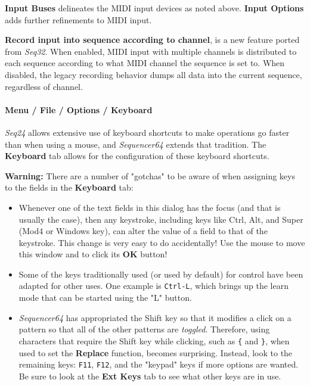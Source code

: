    \textbf{Input Buses} delineates the MIDI input devices as noted above.
   \textbf{Input Options} adds further refinements to MIDI input.

   \textbf{Record input into sequence according to channel},
   is a new feature ported from \textsl{Seq32}.
   When enabled, MIDI input with multiple channels is distributed to
   each sequence according to what MIDI channel the sequence is set to.
   When disabled, the legacy recording behavior dumps all data into the current
   sequence, regardless of channel.

\paragraph{Menu / File / Options / Keyboard }
\label{paragraph:seq64_menu_file_options_keyboard}

   \textsl{Seq24} allows extensive use of
   keyboard shortcuts to make operations go faster than when using a mouse,
   and \textsl{Sequencer64} extends that tradition.
   The \textbf{Keyboard} tab allows for the configuration of these keyboard
   shortcuts.

   \textbf{Warning:}
   There are a number of "gotchas" to be aware of when assigning keys to the
   fields in the \textbf{Keyboard} tab:

   \begin{itemize}
      \item Whenever one of the text fields in this dialog has the focus (and
         that is usually the case), then any keystroke, including keys like
         Ctrl, Alt, and Super (Mod4 or Windows key), can alter the value of a
         field to that of the keystroke.  This change is very easy to do
         accidentally!  \textsf{Use the mouse} to move this window and to click
         its \textbf{OK} button!
      \item Some of the keys traditionally used (or used by default) for
         control have been adapted for other uses.  One example is
         \texttt{Ctrl-L}, which brings up the learn mode that can be started
         using the "L" button.
      \item \textsl{Sequencer64} has appropriated the
          Shift key so that it
         modifies a click on a pattern so that all of the other patterns are
         \textsl{toggled}.  Therefore, using characters that require the Shift
         key while clicking, such as \texttt{\{} and \texttt{\}}, when used
         to set the \textbf{Replace} function, becomes surprising.
         Instead, look to the remaining keys: \texttt{F11}, \texttt{F12},
         and the "keypad" keys if more options are wanted.  Be sure to
         look at the \textbf{Ext Keys} tab to see what other keys are in use.
   \end{itemize}

